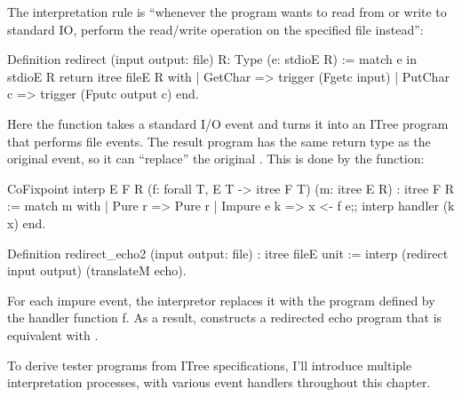 The interpretation rule is ``whenever the program wants to read from or write to
standard IO, perform the read/write operation on the specified file instead'':
\begin{coq}
  Definition redirect (input output: file) {R: Type} (e: stdioE R) :=
    match e in stdioE R return itree fileE R with
    | GetChar   => trigger (Fgetc input)
    | PutChar c => trigger (Fputc output c)
    end.
\end{coq}

Here the  function takes a standard I/O event and turns it into an
ITree program that performs file events.  The result program has the same return
type as the original event, so it can ``replace'' the original .
This is done by the  function:
\begin{coq}
  CoFixpoint interp {E F R} (f: forall {T}, E T -> itree F T) (m: itree E R)
             : itree F R :=
    match m with
    | Pure   r   => Pure r
    | Impure e k => x <- f e;;
                    interp handler (k x)
    end.

  Definition redirect_echo2 (input output: file) : itree fileE unit :=
    interp (redirect input output) (translateM echo).
\end{coq}

For each impure event, the interpretor replaces it with the program defined by
the handler function \ilc f.  As a result,  constructs a
redirected echo program that is equivalent with .

To derive tester programs from ITree specifications, I'll introduce multiple
interpretation processes, with various event handlers throughout this chapter.
